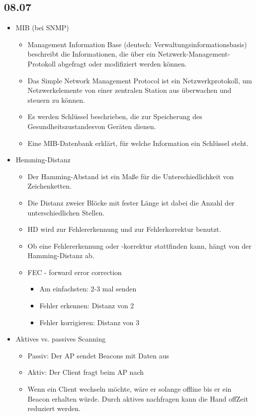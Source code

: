 \documentclass{article} %
\begin{document}
	\subsection{08.07}
	\begin{itemize}
		\item MIB (bei SNMP)
		\begin{itemize}
			\item Management Information Base (deutsch: Verwaltungsinformationsbasis) beschreibt die Informationen, die über ein Netzwerk-Management-Protokoll abgefragt oder modifiziert werden können.
			\item Das Simple Network Management Protocol ist ein Netzwerkprotokoll, um Netzwerkelemente von einer zentralen Station aus überwachen und steuern zu können. 
			\item Es werden Schlüssel beschrieben, die zur Speicherung des \glqq Gesundheitszustandes\grqq von Geräten dienen.
			\item Eine MIB-Datenbank erklärt, für welche Information ein Schlüssel steht.
		\end{itemize}
		\item Hemming-Distanz
		\begin{itemize}
			\item Der Hamming-Abstand ist ein Maße für die Unterschiedlichkeit von Zeichenketten. 
			\item Die Distanz zweier Blöcke mit fester Länge ist dabei die Anzahl der unterschiedlichen Stellen.
			\item HD wird zur Fehlererkennung und zur Fehlerkorrektur benutzt.
			\item Ob eine Fehlererkennung oder -korrektur stattfinden kann, hängt von der Hamming-Distanz ab.
			\item FEC - forward error correction
			\begin{itemize}
				\item Am einfachsten: 2-3 mal senden
				\item Fehler erkennen: Distanz von 2
				\item Fehler korrigieren: Distanz von 3
			\end{itemize}
		\end{itemize}
		\item Aktives vs. passives Scanning
		\begin{itemize}
			\item Passiv: Der AP sendet Beacons mit Daten aus
			\item Aktiv: Der Client fragt beim AP nach
			\item Wenn ein Client wechseln möchte, wäre er solange offline bis er ein Beacon erhalten würde. Durch aktives nachfragen kann die \glqq Hand off\grqq Zeit reduziert werden.

\end{itemize}
\end{itemize}
\end{document}
